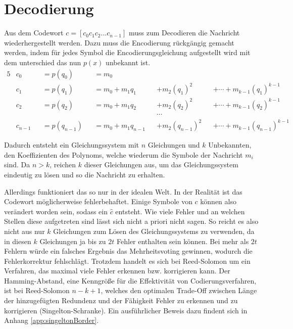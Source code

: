 \section{Decodierung}\label{sec:decoding}

Aus dem Codewort $c=[c_{0}c_{1}c_{2}...c_{n-1}]$ muss zum Decodieren die Nachricht wiederhergestellt werden.
Dazu muss die Encodierung rückgängig gemacht werden, indem für jedes Symbol die Encodierungsgleichung aufgestellt wird mit dem unterschied das nun $p(x)$ unbekannt ist.
\begin{alignat}{5}
	&c_0&&=p(q_0)&&=m_0\nonumber\\
	&c_1&&=p(q_1)&&=m_0+m_1 q_1&&+m_2 (q_1)^2&&+\cdots+m_{k-1} (q_1)^{k-1}\nonumber\\
	&c_2&&=p(q_2)&&=m_0+m_1 q_2&&+m_2 (q_2)^2&&+\cdots+m_{k-1} (q_2)^{k-1}\nonumber\\
	&&&&&&&\cdots\nonumber\\
	&c_{n-1}&&=p(q_{n-1})&&=m_0+m_1 q_{n-1}&&+m_2 (q_{n-1})^2&&+\cdots+m_{k-1} (q_{n-1})^{k-1}\nonumber
\end{alignat}

Dadurch entsteht ein Gleichungssystem mit $n$ Gleichungen und $k$ Unbekannten, den Koeffizienten des Polynoms, welche wiederum die Symbole der Nachricht $m_i$ sind. 
Da $n>k$, reichen $k$ dieser Gleichungen aus, um das Gleichungssystem eindeutig zu lösen und so die Nachricht zu erhalten.

Allerdings funktioniert das so nur in der idealen Welt. 
In der Realität ist das Codewort möglicherweise fehlerbehaftet. 
Einige Symbole von $c$ können also verändert worden sein, sodass ein $\hat{c}$ entsteht. 
Wie viele Fehler und an welchen Stellen diese aufgetreten sind lässt sich nicht a priori nicht sagen. 
So reicht es also nicht aus nur $k$ Gleichungen zum Lösen des Gleichungssystems zu verwenden, da in diesen $k$ Gleichungen ja bis zu $2t$ Fehler enthalten sein können.
Bei mehr als $2t$ Fehlern würde ein falsches Ergebnis das Mehrheitsvoting gewinnen, wodurch die Fehlerkorrektur fehlschlägt.
Trotzdem handelt es sich bei Reed-Solomon um ein Verfahren, das maximal viele Fehler erkennen bzw. korrigieren kann.
Der Hamming-Abstand, eine Kenngröße für die Effektivität von Codierungsverfahren, ist bei Reed-Solomon $n-k+1$, welches den optimalen Trade-Off zwischen Länge der hinzugefügten Redundenz und der Fähigkeit Fehler zu erkennen und zu korrigieren (Singelton-Schranke).
Ein ausführlicher Beweis dazu findent sich in Anhang \ref{app:singeltonBorder}.

